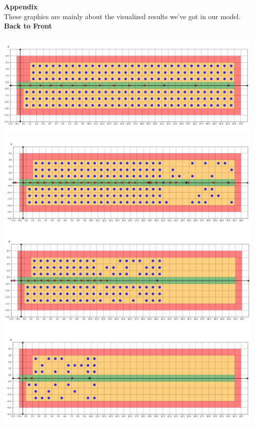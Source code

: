 \documentclass{article}
\theoremstyle{definition}
\theoremstyle{remark}
\numberwithin{equation}{section}
\begin{document}
	\newpage
	\cleardoublepage
	\thispagestyle{empty}
	\renewcommand\refname{Appendix}
	\Huge \textbf{Appendix}
	\\[0.8cm]
	\normalsize These graphics are mainly about the visualized results we've got in our model.
	\\[2pt]
	\large \textbf{Back to Front}
	\begin{center}
		\includegraphics[width=14cm]{backtofront1.jpg}\\
		\includegraphics[width=14cm]{backtofront2.jpg}\\
		\includegraphics[width=14cm]{backtofront3.jpg}\\
		\clearpage
		\thispagestyle{empty}
		\includegraphics[width=14cm]{backtofront4.jpg}\\
	\end{center}
\end{document}
